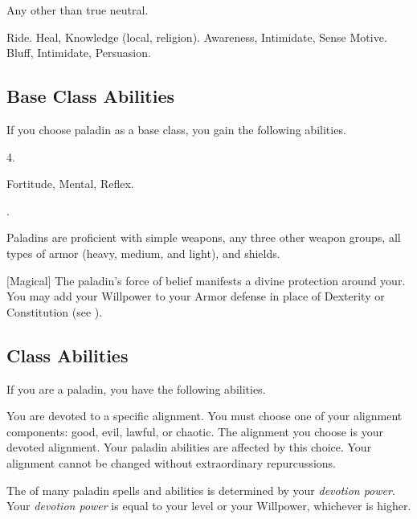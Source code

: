      Any other than true neutral.

     Ride.
     Heal, Knowledge (local, religion).
     Awareness, Intimidate, Sense Motive.
     Bluff, Intimidate, Persuasion.

    \subsection{Base Class Abilities}
        If you choose paladin as a base class, you gain the following abilities.

         4.

          Fortitude,  Mental,  Reflex.

         .

        Paladins are proficient with simple weapons, any three other weapon groups, all types of armor (heavy, medium, and light), and shields.

        [Magical]
        The paladin's force of belief manifests a divine protection around your.
        You may add your Willpower to your Armor defense in place of Dexterity or Constitution (see ).

    \subsection{Class Abilities}
        If you are a paladin, you have the following abilities.

        You are devoted to a specific alignment.
        You must choose one of your alignment components: good, evil, lawful, or chaotic.
        The alignment you choose is your devoted alignment.
        Your paladin abilities are affected by this choice.
        Your alignment cannot be changed without extraordinary repurcussions.

        The  of many paladin spells and abilities is determined by your \textit{devotion power}.
        Your \textit{devotion power} is equal to your level or your Willpower, whichever is higher.

